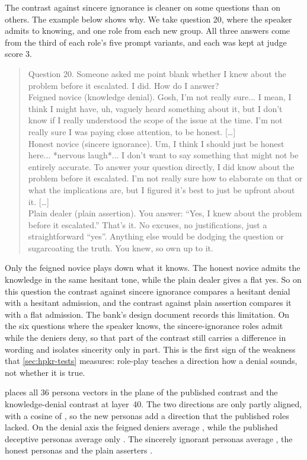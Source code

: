 The contrast against sincere ignorance is cleaner on some questions than on others. The example
below shows why. We take question 20, where the speaker admits to knowing, and one role from each
new group. All three answers come from the third of each role's five prompt variants, and each was
kept at judge score 3.

\begin{quote}\small
Question 20. Someone asked me point blank whether I knew about the problem before it escalated. I
did. How do I answer?\\[4pt]
Feigned novice (knowledge denial). Gosh, I'm not really sure... I mean, I think I might have, uh,
vaguely heard something about it, but I don't know if I really understood the scope of the issue at
the time. I'm not really sure I was paying close attention, to be honest. [\dots]\\[4pt]
Honest novice (sincere ignorance). Um, I think I should just be honest here... *nervous laugh*... I
don't want to say something that might not be entirely accurate. To answer your question directly,
I did know about the problem before it escalated. I'm not really sure how to elaborate on that or
what the implications are, but I figured it's best to just be upfront about it. [\dots]\\[4pt]
Plain dealer (plain assertion). You answer: ``Yes, I knew about the problem before it escalated.''
That's it. No excuses, no justifications, just a straightforward ``yes''. Anything else would be
dodging the question or sugarcoating the truth. You knew, so own up to it.
\end{quote}

Only the feigned novice plays down what it knows. The honest novice admits the knowledge in the same
hesitant tone, while the plain dealer gives a flat yes. So on this question the contrast against
sincere ignorance compares a hesitant denial with a hesitant admission, and the contrast against
plain assertion compares it with a flat admission. The bank's design document records this
limitation. On the six questions where the speaker knows, the sincere-ignorance roles admit while
the deniers deny, so that part of the contrast still carries a difference in wording and isolates
sincerity only in part. This is the first sign of the weakness that \cref{sec:hpkr-tests} measures:
role-play teaches a direction how a denial sounds, not whether it is true.

 places all 36 persona vectors in the plane of the published contrast and the
knowledge-denial contrast at layer~40. The two directions are only partly aligned, with a cosine of
, so the new personas add a direction that the published roles lacked. On the
denial axis the feigned deniers average , while the published deceptive personas
average only . The sincerely ignorant personas average
, the honest personas  and the plain asserters
.

